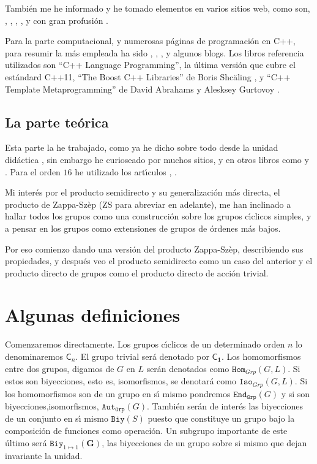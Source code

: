\documentclass[final,12pt,a4paper,twoside,fleqn]{extbook}
\newcommand{\grG}{\ensuremath{\mathbf{G}}}
\newcommand{\biy}[1]{\ensuremath{{\mathtt{Biy}}{\left({#1}\right)}}}
\newcommand{\biyuno}[1]{\ensuremath{
        {{\mathtt{Biy}}_{1\mapsto1}}
        {\left({#1}\right)}
}}
\newcommand{\graut}[1]{\ensuremath{{\mathtt{Aut}}_{\mathtt{Grp}}{\left({#1}\right)}}}
\newcommand{\grendo}[1]{\ensuremath{{\mathtt{End}}_{\mathtt{Grp}}{\left({#1}\right)}}}
\newcommand{\grhom}[2]{\ensuremath{
        {{\mathtt{Hom}}_{Grp}}
        {\left({#1,#2}\right)}
}}
\newcommand{\griso}[2]{\ensuremath{
        {{\mathtt{Iso}}_{Grp}}
        {\left({#1,#2}\right)}
}}
\newcommand{\grclass}[1]{\ensuremath{\mathsf{#1}}}
\newcommand{\cyclicgr}[1]{\ensuremath{{\grclass{C}}_{#1}}}
\newcommand{\trivialgr}{\ensuremath{{\grclass{C}}_{\mathbf{1}}}}
\theoremstyle{definition}
\theoremstyle{remark}
\begin{document}
Tambi\'en me he informado y he tomado elementos en varios sitios web, como son,
\cite{GroupProps},
\cite{WIKIPEDIAen},
\cite{WIKIPEDIAes},
\cite{ProofWiki},
\cite{GroupNames}
y con gran profusi\'on \cite{MATHStackExchange}.

Para la parte computacional, \cite{GAP} y numerosas p\'aginas de
programaci\'on en C++, para resumir la m\'as empleada ha sido
\cite{CppProgStackExchange}, \cite{CPPReference}, \cite{CPlusPlus}, y
algunos blogs. Los libros referencia utilizados son ``C++ Language Programming'',
la \'ultima versi\'on que cubre el est\'andard C++11\cite{Stroustrup2013},
``The Boost C++ Libraries'' de Boris Shcäling \cite{Schaeling2011}, y
``C++ Template Metaprogramming'' de David Abrahams y Alesksey Gurtovoy
\cite{DavidAbrahams2005}.

\section{La parte te\'orica}

Esta parte la he trabajado, como ya he dicho sobre todo desde la unidad did\'actica \cite{EBujalance1989}, sin embargo he curioseado por muchos sitios, y en otros libros como \cite{Burnside1897} y \cite{Hall1959}. Para el orden $16$ he utilizado los art{\'{\i}}culos \cite{Clausen2012}, \cite{Wilde2005}.

Mi inter\'es por el producto semidirecto y su generalizaci\'on m\'as directa, el producto de Zappa-Szèp (ZS para abreviar en adelante), me han inclinado a hallar todos los grupos como una construcci\'on sobre los grupos c{\'{\i}}clicos simples, y a pensar en los grupos como extensiones de grupos de \'ordenes m\'as bajos.

Por eso comienzo dando una versi\'on del producto Zappa-Szèp, describiendo sus propiedades, y despu\'es veo el producto semidirecto como un caso del anterior y el producto directo de grupos como el producto directo de acci\'on trivial.

\chapter{Algunas definiciones}

Comenzaremos directamente. Los grupos c{\'{\i}}clicos de un determinado orden
$n$ lo denominaremos $\cyclicgr{n}$. El grupo trivial ser\'a denotado
por $\trivialgr$. Los homomorfismos entre dos grupos, digamos
de $G$ en $L$ ser\'an denotados como $\grhom{G}{L}$. Si estos son biyecciones,
esto es, isomorfismos,
se denotar\'a como $\griso{G}{L}$. Si los homomorfismos son de un grupo
en s{\'{\i}} mismo pondremos $\grendo{G}$ y si son biyecciones,isomorfismos,
$\graut{G}$.
Tambi\'en
ser\'an de inter\'es las biyecciones de un conjunto en s{\'{\i}} mismo $\biy{S}$
puesto que constituye un grupo bajo la composici\'on de funciones como operaci\'on.
Un subgrupo importante de este \'ultimo ser\'a $\biyuno{\grG}$, las biyecciones
de un grupo sobre si mismo que dejan invariante la unidad.
\end{document}
